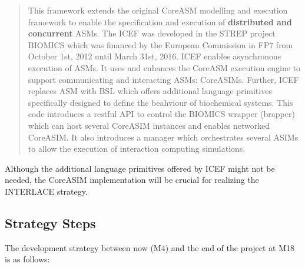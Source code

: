 \begin{quote}
\small
\vspace{-0.3cm}
This framework extends the original CoreASM modelling and execution framework to enable the specification and execution of \textbf{distributed and concurrent} ASMs. The ICEF was developed in the STREP project BIOMICS which was financed by the European Commission in FP7 from October 1st, 2012 until March 31st, 2016. ICEF enables asynchronous execution of ASMs. It uses and enhances the CoreASM execution engine to support communicating and interacting ASMs: CoreASIMs. Further, ICEF replaces ASM with BSL which offers additional language primitives specifically designed to define the beahviour of biochemical systems. This code introduces a restful API to control the BIOMICS wrapper (brapper) which can host several CoreASIM instances and enables networked CoreASIM. It also introduces a manager which orchestrates several ASIMs to allow the execution of interaction computing simulations.
\end{quote}

Although the additional language primitives offered by ICEF might not be needed, the CoreASIM implementation will be crucial for realizing the INTERLACE strategy.

\subsection{Strategy Steps}\label{subsection-strategy-steps}
The development strategy between now (M4) and the end of the project at M18 is as follows:

